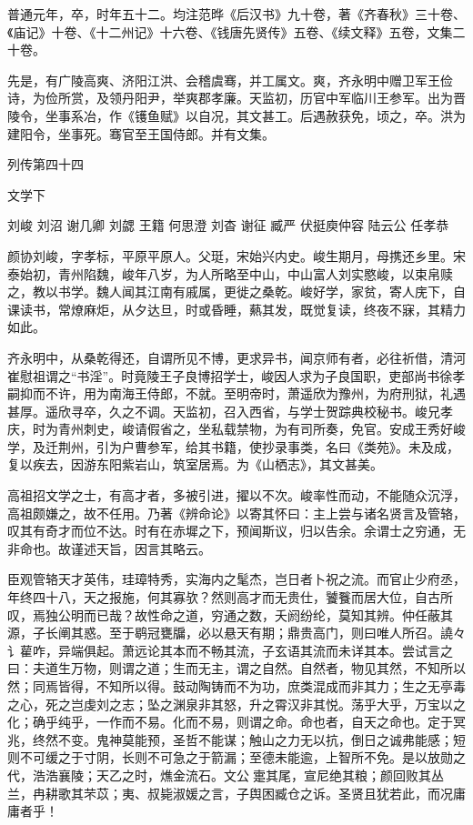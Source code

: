 \documentclass[12pt,UTF8]{ctexbook}
\begin{document}
普通元年，卒，时年五十二。均注范晔《后汉书》九十卷，著《齐春秋》三十卷、《庙记》十卷、《十二州记》十六卷、《钱唐先贤传》五卷、《续文释》五卷，文集二十卷。

先是，有广陵高爽、济阳江洪、会稽虞骞，并工属文。爽，齐永明中赠卫军王俭诗，为俭所赏，及领丹阳尹，举爽郡孝廉。天监初，历官中军临川王参军。出为晋陵令，坐事系冶，作《镬鱼赋》以自况，其文甚工。后遇赦获免，顷之，卒。洪为建阳令，坐事死。骞官至王国侍郎。并有文集。





列传第四十四

文学下

刘峻 刘沼 谢几卿 刘勰 王籍 何思澄 刘杳 谢征 臧严 伏挺庾仲容 陆云公 任孝恭

颜协刘峻，字孝标，平原平原人。父珽，宋始兴内史。峻生期月，母携还乡里。宋泰始初，青州陷魏，峻年八岁，为人所略至中山，中山富人刘实愍峻，以束帛赎之，教以书学。魏人闻其江南有戚属，更徙之桑乾。峻好学，家贫，寄人庑下，自课读书，常燎麻炬，从夕达旦，时或昏睡，爇其发，既觉复读，终夜不寐，其精力如此。

齐永明中，从桑乾得还，自谓所见不博，更求异书，闻京师有者，必往祈借，清河崔慰祖谓之“书淫”。时竟陵王子良博招学士，峻因人求为子良国职，吏部尚书徐孝嗣抑而不许，用为南海王侍郎，不就。至明帝时，萧遥欣为豫州，为府刑狱，礼遇甚厚。遥欣寻卒，久之不调。天监初，召入西省，与学士贺踪典校秘书。峻兄孝庆，时为青州刺史，峻请假省之，坐私载禁物，为有司所奏，免官。安成王秀好峻学，及迁荆州，引为户曹参军，给其书籍，使抄录事类，名曰《类苑》。未及成，复以疾去，因游东阳紫岩山，筑室居焉。为《山栖志》，其文甚美。

高祖招文学之士，有高才者，多被引进，擢以不次。峻率性而动，不能随众沉浮，高祖颇嫌之，故不任用。乃著《辨命论》以寄其怀曰：主上尝与诸名贤言及管辂，叹其有奇才而位不达。时有在赤墀之下，预闻斯议，归以告余。余谓士之穷通，无非命也。故谨述天旨，因言其略云。

臣观管辂天才英伟，珪璋特秀，实海内之髦杰，岂日者卜祝之流。而官止少府丞，年终四十八，天之报施，何其寡欤？然则高才而无贵仕，饕餮而居大位，自古所叹，焉独公明而已哉？故性命之道，穷通之数，夭阏纷纶，莫知其辨。仲任蔽其源，子长阐其惑。至于鹖冠甕牖，必以悬天有期；鼎贵高门，则曰唯人所召。譊々讠雚咋，异端俱起。萧远论其本而不畅其流，子玄语其流而未详其本。尝试言之曰：夫道生万物，则谓之道；生而无主，谓之自然。自然者，物见其然，不知所以然；同焉皆得，不知所以得。鼓动陶铸而不为功，庶类混成而非其力；生之无亭毒之心，死之岂虔刘之志；坠之渊泉非其怒，升之霄汉非其悦。荡乎大乎，万宝以之化；确乎纯乎，一作而不易。化而不易，则谓之命。命也者，自天之命也。定于冥兆，终然不变。鬼神莫能预，圣哲不能谋；触山之力无以抗，倒日之诚弗能感；短则不可缓之于寸阴，长则不可急之于箭漏；至德未能逾，上智所不免。是以放勋之代，浩浩襄陵；天乙之时，燋金流石。文公疐其尾，宣尼绝其粮；颜回败其丛兰，冉耕歌其芣苡；夷、叔毙淑媛之言，子舆困臧仓之诉。圣贤且犹若此，而况庸庸者乎！
\end{document}
